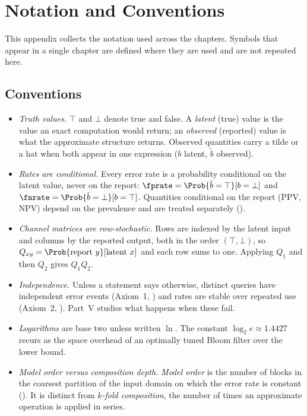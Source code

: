 \chapter{Notation and Conventions}
\label{app:notation}

This appendix collects the notation used across the chapters. Symbols that
appear in a single chapter are defined where they are used and are not repeated
here.

\section*{Conventions}

\begin{itemize}
  \item \emph{Truth values.} $\top$ and $\bot$ denote true and false. A
    \emph{latent} (true) value is the value an exact computation would return;
    an \emph{observed} (reported) value is what the approximate structure
    returns. Observed quantities carry a tilde or a hat when both appear in one
    expression ($b$ latent, $\tilde{b}$ observed).
  \item \emph{Rates are conditional.} Every error rate is a probability
    conditional on the latent value, never on the report:
    $\fprate = \Prob{\tilde{b} = \top}[b = \bot]$ and
    $\fnrate = \Prob{\tilde{b} = \bot}[b = \top]$. Quantities conditional
    on the report (PPV, NPV) depend on the prevalence and are treated separately
    ().
  \item \emph{Channel matrices are row-stochastic.} Rows are indexed by the
    latent input and columns by the reported output, both in the order
    $(\top, \bot)$, so $Q_{xy} = \Prob{\text{report } y}[\text{latent } x]$
    and each row sums to one. Applying $Q_1$ and then $Q_2$ gives $Q_1 Q_2$.
  \item \emph{Independence.} Unless a statement says otherwise, distinct
    queries have independent error events (Axiom~1, )
    and rates are stable over repeated use (Axiom~2,
    ). Part~V studies what happens when these fail.
  \item \emph{Logarithms} are base two unless written $\ln$. The constant
    $\log_2 e \approx 1.4427$ recurs as the space overhead of an optimally
    tuned Bloom filter over the lower bound.
  \item \emph{Model order versus composition depth.} \emph{Model order} is the
    number of blocks in the coarsest partition of the input domain on which the
    error rate is constant (). It is distinct from
    \emph{$k$-fold composition}, the number of times an approximate operation
    is applied in series.
\end{itemize}

